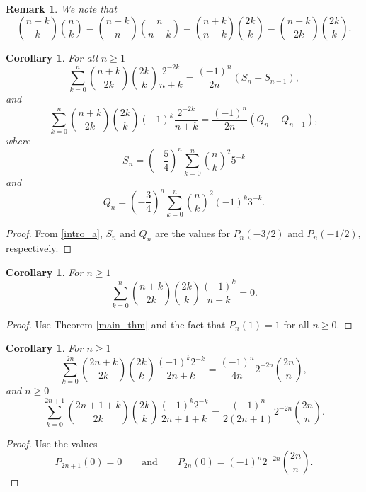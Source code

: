 \documentclass[11pt,reqno]{amsart}
\theoremstyle{plain}
\numberwithin{equation}{section}
\newtheorem{corollary}[thm]{Corollary}
\newtheorem{remark}[thm]{Remark}
\begin{document}
\begin{remark}
We note that
\[\binom{n+k}{k}\binom{n}{k}=\binom{n+k}{n}\binom{n}{n-k}=\binom{n+k}{n-k}\binom{2k}{k}=\binom{n+k}{2k}\binom{2k}{k}.\]  
\end{remark}

\begin{corollary}
For all $n\geq 1$
\begin{equation}
\sum_{k=0}^n \binom{n+k}{2k} \binom{2k}{k} \frac{2^{-2k}}{n+k} = \frac{(-1)^n}{2n} ( S_n - S_{n-1}),
\end{equation}
and
\begin{equation}
\sum_{k=0}^n \binom{n+k}{2k} \binom{2k}{k} (-1)^k \frac{2^{-2k}}{n+k} = \frac{(-1)^n}{2n} ( Q_n - Q_{n-1}),
\end{equation}
where
$$S_n=\left (-\frac{5}{4}\right )^n \sum_{k=0}^n \binom{n}{k}^2 5^{-k}$$
and
$$Q_n=\left (-\frac{3}{4}\right )^n \sum_{k=0}^n \binom{n}{k}^2 (-1)^k 3^{-k}.$$
\end{corollary}
\begin{proof}
From \eqref{intro_a}, $S_n$ and $Q_n$ are the values for $P_n(-3/2)$ and $P_n(-1/2)$, respectively.
\end{proof}

\begin{corollary}
For $n\geq 1$
\begin{equation}\label{xxx_id}
\sum_{k=0}^{n} \binom{n+k}{2k} \binom{2k}{k} \frac{(-1)^k}{n+k} = 0.
\end{equation}
\end{corollary}
\begin{proof}
Use Theorem \ref{main_thm} and the fact that $P_{n}(1) = 1$ for all $n\geq 0$.
\end{proof}

\begin{corollary}
For $n\geq 1$
\begin{equation}
\sum_{k=0}^{2n} \binom{2n+k}{2k} \binom{2k}{k} \frac{(-1)^k 2^{-k}}{2n+k} = \frac{(-1)^n}{4n} 2^{-2n} \binom{2n}{n},
\end{equation}
and $n\geq 0$
\begin{equation}
\sum_{k=0}^{2n+1} \binom{2n+1+k}{2k} \binom{2k}{k}  \frac{(-1)^k 2^{-k}}{2n+1+k} = \frac{(-1)^n}{2(2n+1)} 2^{-2n} \binom{2n}{n}.
\end{equation}
\end{corollary}
\begin{proof}
Use the values
$$P_{2n+1}(0) = 0 \qquad\text{and}\qquad P_{2n}(0) = (-1)^n 2^{-2n} \binom{2n}{n}.$$
\end{proof}
\end{document}
